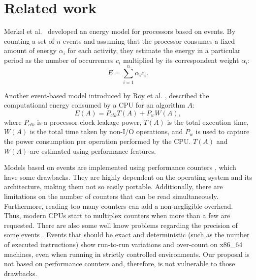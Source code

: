 \section{Related work} \label{sec:relatedwork}

Merkel et al.~\cite{Merkel2006BalancingSystems} developed an energy model for processors based on events. By counting a set of $n$ events and assuming that the processor consumes a fixed amount of energy $\alpha_i$ for each activity, they estimate the energy in a particular period as the number of occurrences $c_i$  multiplied by its correspondent weight $\alpha_i$:
\begin{equation}
E = \sum_{i=1}^{n}\alpha_ic_i.
\end{equation}

Another event-based model introduced by Roy et al. \cite{Roy2013AnAlgorithms}, described the computational energy consumed by a CPU for an algorithm $A$:
\begin{equation}
E(A) = P_{clk}T(A) + P_wW(A),
\end{equation}
where $P_{clk}$ is a processor clock leakage power, $T(A)$ is the total execution time, $W(A)$ is the total time taken by  non-I/O operations, and $P_w$ is used to capture the power consumption per operation performed by the CPU. $T(A)$ and $W(A)$ are estimated using performance features.

Models based on events are implemented using performance counters \cite{Fahad2019AComputing}, which have some drawbacks. They are highly dependent on the operating system and its architecture, making them not so easily portable. Additionally, there are limitations on the number of counters that can be read simultaneously. Furthermore, reading too many counters can add a non-negligible overhead. Thus, modern CPUs start to multiplex counters when more than a few are requested. There are also some well know problems regarding the precision of some events \cite{Weaver2008, Weaver2013a, Das2019SoK:Security, McGuire2009, Ramos2019AnCounters, Silva-De-Souza2020Containergy-aWorkloads}. Events that should be exact and deterministic (such as the number of executed instructions) show run-to-run variations and over-count on x86\_64 machines, even when running in strictly controlled environments. Our proposal is not based on performance counters and, therefore, is not vulnerable to those drawbacks.


